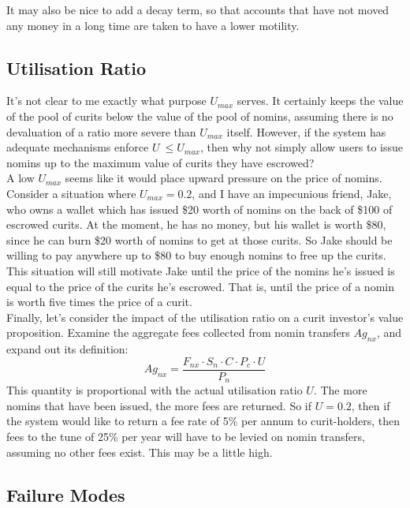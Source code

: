 \documentclass{article}
\begin{document}
\noindent It may also be nice to add a decay term, so that accounts that have not moved any money in a long time
are taken to have a lower motility.


\pagebreak
\subsection{Utilisation Ratio}

It's not clear to me exactly what purpose \(U_{max}\) serves. It certainly keeps the value of the pool of
curits below the value of the pool of nomins, assuming there is no devaluation of a ratio more severe than 
\(U_{max}\) itself. However, if the system has adequate mechanisms enforce \(U\ \leq U_{max}\), then
why not simply allow users to issue nomins up to the maximum value of curits they have escrowed? \\

\noindent A low \(U_{max}\) seems like it would place upward pressure on the price of nomins.
Consider a situation where \(U_{max} = 0.2\), and I have an impecunious friend, Jake, who owns a wallet which
has issued \$20 worth of nomins on the back of \$100 of escrowed curits. At the moment, he has no
money, but his wallet is worth \$80, since he can burn \$20 worth of nomins to get at those curits.
So Jake should be willing to pay anywhere up to \$80 to buy enough nomins to free up the curits.
This situation will still motivate Jake until the price of the nomins he's issued is equal to the
price of the curits he's escrowed. That is, until the price of a nomin is worth five times the price of
a curit.\\

\noindent Finally, let's consider the impact of the utilisation ratio on a curit investor's value proposition.
Examine the aggregate fees collected from nomin transfers \(Ag_{nx}\), and expand out its definition:
\[Ag_{nx} = \frac{F_{nx} \cdot S_n \cdot C \cdot P_c \cdot U}{P_n}\]
This quantity is proportional with the actual utilisation ratio \(U\). The more nomins that have
been issued, the more fees are returned. So if \(U = 0.2\), then if the system would like to return 
a fee rate of 5\% per annum to curit-holders, then fees to the tune of 25\% per year will have to be
levied on nomin transfers, assuming no other fees exist. This may be a little high.

\pagebreak
\subsection{Failure Modes}
\end{document}
